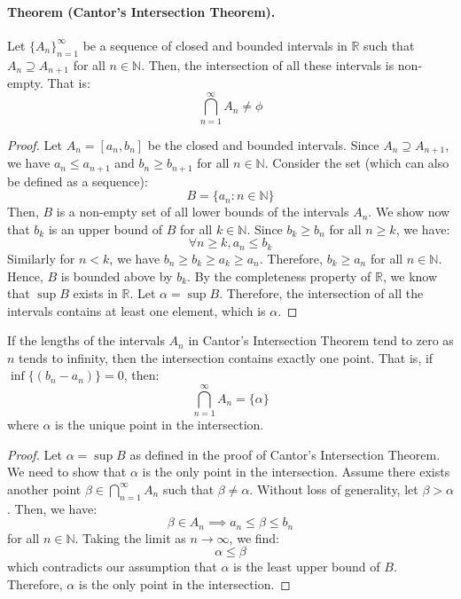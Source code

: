 \documentclass[openany]{book}
\numberwithin{equation}{section}
\begin{document}
\paragraph{Theorem (Cantor's Intersection Theorem).}

Let $\{A_n\}_{n=1}^{\infty}$ be a sequence of closed and bounded intervals in $\mathbb{R}$ such that $A_n \supseteq A_{n+1}$ for all $n \in \mathbb{N}$. Then, the intersection of all these intervals is non-empty. That is:
$$\bigcap_{n=1}^{\infty} A_n \neq \phi$$
\par
\begin{proof}
Let $A_n = [a_n, b_n]$ be the closed and bounded intervals. Since $A_n \supseteq A_{n+1}$, we have $a_n \leq a_{n+1}$ and $b_n \geq b_{n+1}$ for all $n \in \mathbb{N}$. Consider the set (which can also be defined as a sequence): 
$$B = \{a_n: n \in \mathbb{N}\}$$
Then, $B$ is a non-empty set of all lower bounds of the intervals $A_n$. We show now that $b_k$ is an upper bound of $B$ for all $k \in \mathbb{N}$. Since $b_k \geq b_n$ for all $n \geq k$, we have:
$$\forall n \geq k, a_n \leq b_k$$
Similarly for $n < k$, we have $b_n \geq b_k \geq a_k \geq a_n$. Therefore, $b_k \geq a_n$ for all $n \in \mathbb{N}$. Hence, $B$ is bounded above by $b_k$. By the completeness property of $\mathbb{R}$, we know that $\sup B$ exists in $\mathbb{R}$. Let $\alpha = \sup B$. Therefore, the intersection of all the intervals contains at least one element, which is $\alpha$.
\end{proof}
\begin{corollary}
    If the lengths of the intervals $A_n$ in Cantor's Intersection Theorem tend to zero as $n$ tends to infinity, then the intersection contains exactly one point. That is, if $\inf\{(b_n - a_n)\} = 0$, then:
    $$\bigcap_{n=1}^{\infty} A_n = \{\alpha\}$$
    where $\alpha$ is the unique point in the intersection.
\end{corollary}
\begin{proof}
Let $\alpha = \sup B$ as defined in the proof of Cantor's Intersection Theorem. We need to show that $\alpha$ is the only point in the intersection. Assume there exists another point $\beta \in \bigcap_{n=1}^{\infty} A_n$ such that $\beta \neq \alpha$. Without loss of generality, let $\beta > \alpha$. Then, we have:
$$\beta \in A_n \implies a_n \leq \beta \leq b_n$$
for all $n \in \mathbb{N}$. Taking the limit as $n \to \infty$, we find:
$$\alpha \leq \beta$$
which contradicts our assumption that $\alpha$ is the least upper bound of $B$. Therefore, $\alpha$ is the only point in the intersection.
\end{proof}
\end{document}
